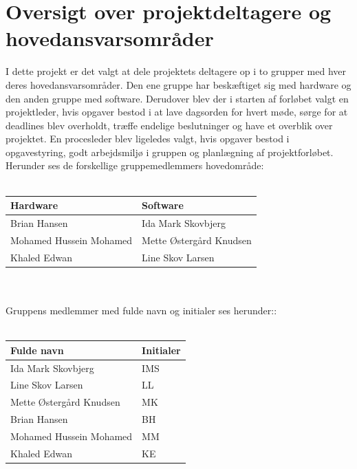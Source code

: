 \section{Oversigt over projektdeltagere og hovedansvarsområder}
I dette projekt er det valgt at dele projektets deltagere op i to grupper med hver deres hovedansvarsområder. Den ene gruppe har beskæftiget sig med hardware og den anden gruppe med software. Derudover blev der i starten af forløbet valgt en projektleder, hvis opgaver bestod i at lave dagsorden for hvert møde, sørge for at deadlines blev overholdt, træffe endelige beslutninger og have et overblik over projektet. En procesleder blev ligeledes valgt, hvis opgaver bestod i opgavestyring, godt arbejdsmiljø i gruppen og planlægning af projektforløbet. \\
Herunder ses de forskellige gruppemedlemmers hovedområde:\\\\
\begin{tabular}{| l | l |} \hline
\textbf{Hardware} & \textbf{Software}\\\hline
Brian Hansen & Ida Mark Skovbjerg \\\hline 
Mohamed Hussein Mohamed & Mette Østergård Knudsen \\\hline
Khaled Edwan & Line Skov Larsen  \\\hline 
\end{tabular}
\\\\
Gruppens medlemmer med fulde navn og initialer ses herunder:: \\\\
\begin{tabular}{| l | l |} \hline
\textbf{Fulde navn} & \textbf{Initialer}\\\hline
Ida Mark Skovbjerg & IMS \\\hline 
Line Skov Larsen & LL \\\hline
Mette Østergård Knudsen & MK  \\\hline 
Brian Hansen & BH \\\hline
Mohamed Hussein Mohamed & MM \\\hline 
Khaled Edwan & KE \\\hline
\end{tabular}

